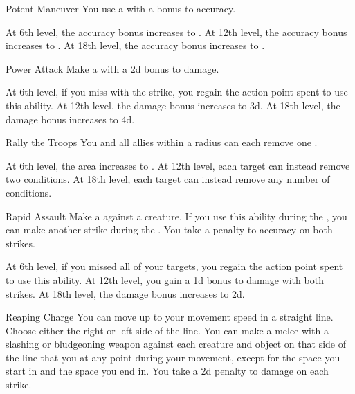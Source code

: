 {            \begin{ability}{Potent Maneuver}
                You use a  with a  bonus to accuracy.

                At 6th level, the accuracy bonus increases to .
                At 12th level, the accuracy bonus increases to .
                At 18th level, the accuracy bonus increases to .
            \end{ability}

            \begin{ability}{Power Attack}
                Make a  with a \plus2d bonus to damage.

                At 6th level, if you miss with the strike, you regain the action point spent to use this ability.
                At 12th level, the damage bonus increases to \plus3d.
                At 18th level, the damage bonus increases to \plus4d.
            \end{ability}

            \begin{ability}{Rally the Troops}
                You and all allies within a \areamed radius can each remove one .

                At 6th level, the area increases to \arealarge.
                At 12th level, each target can instead remove two conditions.
                At 18th level, each target can instead remove any number of conditions.
            \end{ability}

            \begin{ability}{Rapid Assault}
                Make a  against a creature.
                If you use this ability during the , you can make another strike during the .
                You take a  penalty to accuracy on both strikes.

                At 6th level, if you missed all of your targets, you regain the action point spent to use this ability.
                At 12th level, you gain a \plus1d bonus to damage with both strikes.
                At 18th level, the damage bonus increases to \plus2d.
            \end{ability}

            \begin{ability}{Reaping Charge}
                You can move up to your movement speed in a straight line.
                Choose either the right or left side of the line.
                You can make a melee  with a slashing or bludgeoning weapon against each creature and object on that side of the line that you  at any point during your movement, except for the space you start in and the space you end in.
                You take a \minus2d penalty to damage on each strike.


\end{ability}}
